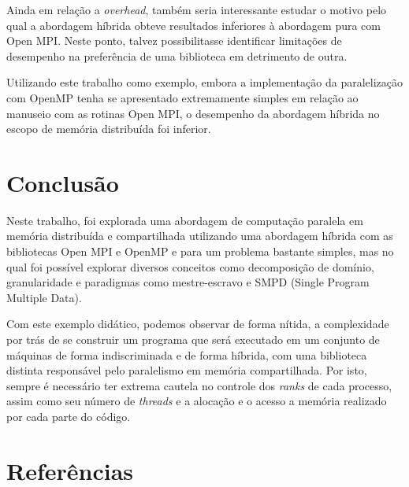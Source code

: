 \documentclass[a4paper, 12pt]{article}
\begin{document}
Ainda em relação a \emph{overhead}, também seria interessante estudar o motivo pelo qual a abordagem híbrida obteve resultados inferiores à abordagem pura com Open MPI. Neste ponto, talvez possibilitasse identificar limitações de desempenho na preferência de uma biblioteca em detrimento de outra. 

Utilizando este trabalho como exemplo, embora a implementação da paralelização com OpenMP tenha se apresentado extremamente simples em relação ao manuseio com as rotinas Open MPI, o desempenho da abordagem híbrida no escopo de memória distribuída foi inferior.

\section{Conclusão}

Neste trabalho, foi explorada uma abordagem de computação paralela em memória distribuída e compartilhada utilizando uma abordagem híbrida com as bibliotecas Open MPI e OpenMP e para um problema bastante simples, mas no qual foi possível explorar diversos conceitos como decomposição de domínio, granularidade e paradigmas como mestre-escravo e SMPD (Single Program Multiple Data).

Com este exemplo didático, podemos observar de forma nítida, a complexidade por trás de se construir um programa que será executado em um conjunto de máquinas de forma indiscriminada e de forma híbrida, com uma biblioteca distinta responsável pelo paralelismo em memória compartilhada. Por isto, sempre é necessário ter extrema cautela no controle dos \emph{ranks} de cada processo, assim como seu número de \emph{threads} e a alocação e o acesso a memória realizado por cada parte do código.

\section*{Referências}
\end{document}
